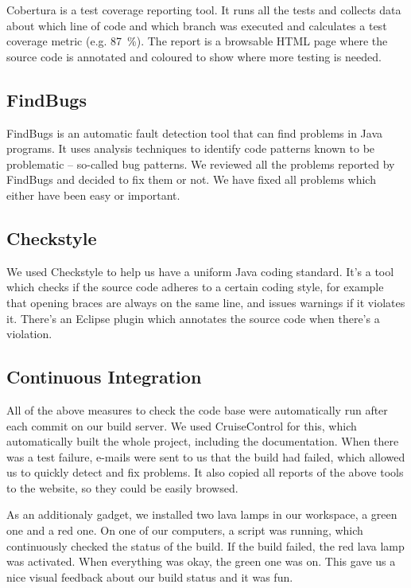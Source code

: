 \documentclass[12pt,halfparskip,DIV11,BCOR10mm]{scrreprt}
\begin{document}
Cobertura is a test coverage reporting tool. It runs all the tests and collects data about which line of code and which branch was executed and calculates a test coverage metric (e.g. 87~\%). The report is a browsable HTML page where the source code is annotated and coloured to show where more testing is needed.

\subsection{FindBugs}

FindBugs is an automatic fault detection tool that can find problems in Java programs. It uses analysis techniques to identify code patterns known to be problematic – so-called bug patterns. We reviewed all the problems reported by FindBugs and decided to fix them or not. We have fixed all problems which either have been easy or important.

\subsection{Checkstyle}

We used Checkstyle to help us have a uniform Java coding standard. It's a tool which checks if the source code adheres to a certain coding style, for example that opening braces are always on the same line, and issues warnings if it violates it. There's an Eclipse plugin which annotates the source code when there's a violation.

\subsection{Continuous Integration}

All of the above measures to check the code base were automatically run after each commit on our build server. We used CruiseControl for this, which automatically built the whole project, including the documentation. When there was a test failure, e-mails were sent to us that the build had failed, which allowed us to quickly detect and fix problems. It also copied all reports of the above tools to the website, so they could be easily browsed.

As an additionaly gadget, we installed two lava lamps in our workspace, a green one and a red one. On one of our computers, a script was running, which continuously checked the status of the build. If the build failed, the red lava lamp was activated. When everything was okay, the green one was on. This gave us a nice visual feedback about our build status and it was fun.
\end{document}
